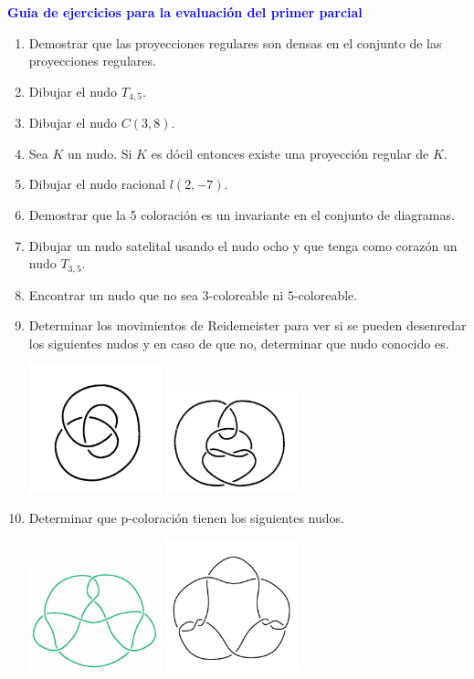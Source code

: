 \documentclass[12pts]{report}
\begin{document}
\begin{center}
\textcolor{blue}{\textbf{\large Guia de ejercicios para la evaluación del primer parcial}}
\end{center}

\begin{enumerate}
\item Demostrar que las proyecciones regulares son densas en el conjunto de las proyecciones regulares.
\item Dibujar el nudo $T_{4,5}$.
\item Dibujar el nudo $C(3,8)$.
\item Sea $K$ un nudo. Si $K$ es dócil entonces existe una proyección regular de $K$.
\item Dibujar el nudo racional $l(2,-7)$.
\item Demostrar que la 5 coloración es un invariante en el conjunto de diagramas.
\item Dibujar un nudo satelital  usando el nudo  ocho y que tenga como corazón un nudo $T_{3, 5}$.
\item Encontrar un nudo que no sea $3$-coloreable ni $5$-coloreable.
\item Determinar los movimientos de Reidemeister para ver si se pueden desenredar los siguientes nudos y en caso de que no, determinar que nudo conocido es.
\begin{center}
\includegraphics[width=0.3\textwidth] {trebol.png}\quad
\includegraphics[width=0.3\textwidth]{desenredar.png}
\end{center}
\item Determinar que p-coloración tienen los siguientes nudos.

\includegraphics[width=0.3\textwidth] {diagrama1.png}\quad 
\includegraphics[width=0.3\textwidth] {diagrama2.png}
\end{enumerate}
\end{document}
